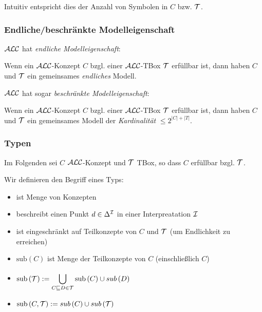 Intuitiv entspricht dies der Anzahl von Symbolen in $C$ bzw. $\mathcal{T}$.

\subsubsection{Endliche/beschränkte Modelleigenschaft}

$\mathcal{A}\mathcal{L}\mathcal{C}$ hat \emph{endliche Modelleigenschaft}:

\begin{theorem}
Wenn ein $\mathcal{A}\mathcal{L}\mathcal{C}$-Konzept $C$ bzgl. einer $\mathcal{A}\mathcal{L}\mathcal{C}$-TBox $\mathcal{T}$ erfüllbar ist, dann haben $C$ und $\mathcal{T}$ ein gemeinsames \emph{endliches} Modell.
\end{theorem}

$\mathcal{A}\mathcal{L}\mathcal{C}$ hat sogar \emph{beschränkte Modelleigenschaft}:

\begin{theorem}
Wenn ein $\mathcal{A}\mathcal{L}\mathcal{C}$-Konzept $C$ bzgl. einer $\mathcal{A}\mathcal{L}\mathcal{C}$-TBox $\mathcal{T}$ erfüllbar ist, dann haben $C$ und $\mathcal{T}$ ein gemeinsames Modell der \emph{Kardinalität} $\leq 2^{|C|+|T|}$.
\end{theorem}

\subsubsection{Typen}
\label{sec:typ}

Im Folgenden sei $C$ $\mathcal{A}\mathcal{L}\mathcal{C}$-Konzept und $\mathcal{T}$ TBox, so dass $C$ erfüllbar bzgl. $\mathcal{T}$.

Wir definieren den Begriff eines Typs:

\begin{itemize}
  \item ist Menge von Konzepten
  \item beschreibt einen Punkt $d \in \Delta^{\mathcal{I}}$ in einer Interpreatation $\mathcal{I}$
  \item ist eingeschränkt auf Teilkonzepte von $C$ und $\mathcal{T}$ (um Endlichkeit zu erreichen)
\end{itemize}

\begin{definition}[Teilkonzepte]\mbox{}

\begin{itemize}
\item
  $\text{sub}\left( C \right)$ ist Menge der Teilkonzepte von $C$
  (einschließlich $C$)
\item
  $\displaystyle \text{sub}\left( \mathcal{T} \right) := \bigcup_{C \sqsubseteq D \in \mathcal{T}}^{}{\text{sub}\left( C \right) \cup sub\left( D \right)}$
\item
  $\text{sub}\left( C,\mathcal{T} \right) := sub\left( C \right) \cup sub\left( \mathcal{T} \right)$
\end{itemize}
\end{definition}

